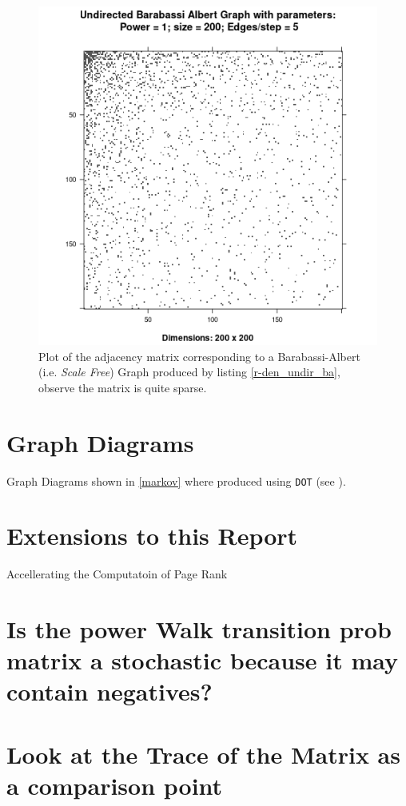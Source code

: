 \documentclass[11pt]{article}
\begin{document}
\begin{figure}[htbp]
\centering
\includegraphics[width=12cm]{media/DensityUndirectedBA.png}
\caption{\label{fig:den_undir_ba}Plot of the adjacency matrix corresponding to a Barabassi-Albert (i.e. \emph{Scale Free}) Graph produced by listing \ref{r-den_undir_ba}, observe the matrix is quite sparse.}
\end{figure}
\section{Graph Diagrams}
\label{sec:orgf487c2a}
Graph Diagrams shown in \ref{markov} where produced using \texttt{DOT} (see \cite{DOTLanguage,DOTGraphDescription2020}).
\section{Extensions to this Report}
\label{sec:orgf6a471e}
Accellerating the Computatoin of Page Rank \cite{langvilleGooglePageRankScience2012}

\section{Is the power Walk transition prob matrix a stochastic because it may contain negatives?}
\label{sec:orgd7d83fe}
\section{Look at the Trace of the Matrix as a comparison point}
\label{sec:org2603cfa}
\end{document}
